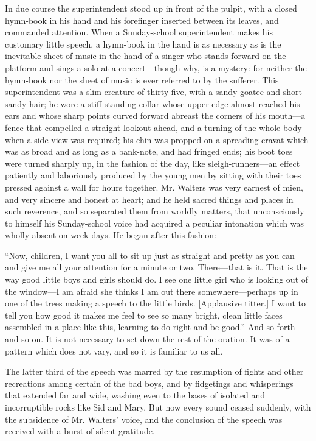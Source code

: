 \documentclass{book}
\begin{document}
In due course the superintendent stood up in front of the pulpit, with a closed hymn-book in his hand and his forefinger inserted between its leaves, and commanded attention. When a Sunday-school superintendent makes his customary little speech, a hymn-book in the hand is as necessary as is the inevitable sheet of music in the hand of a singer who stands forward on the platform and sings a solo at a concert—though why, is a mystery: for neither the hymn-book nor the sheet of music is ever referred to by the sufferer. This superintendent was a slim creature of thirty-five, with a sandy goatee and short sandy hair; he wore a stiff standing-collar whose upper edge almost reached his ears and whose sharp points curved forward abreast the corners of his mouth—a fence that compelled a straight lookout ahead, and a turning of the whole body when a side view was required; his chin was propped on a spreading cravat which was as broad and as long as a bank-note, and had fringed ends; his boot toes were turned sharply up, in the fashion of the day, like sleigh-runners—an effect patiently and laboriously produced by the young men by sitting with their toes pressed against a wall for hours together. Mr. Walters was very earnest of mien, and very sincere and honest at heart; and he held sacred things and places in such reverence, and so separated them from worldly matters, that unconsciously to himself his Sunday-school voice had acquired a peculiar intonation which was wholly absent on week-days. He began after this fashion:

“Now, children, I want you all to sit up just as straight and pretty as you can and give me all your attention for a minute or two. There—that is it. That is the way good little boys and girls should do. I see one little girl who is looking out of the window—I am afraid she thinks I am out there somewhere—perhaps up in one of the trees making a speech to the little birds. [Applausive titter.] I want to tell you how good it makes me feel to see so many bright, clean little faces assembled in a place like this, learning to do right and be good.” And so forth and so on. It is not necessary to set down the rest of the oration. It was of a pattern which does not vary, and so it is familiar to us all.

The latter third of the speech was marred by the resumption of fights and other recreations among certain of the bad boys, and by fidgetings and whisperings that extended far and wide, washing even to the bases of isolated and incorruptible rocks like Sid and Mary. But now every sound ceased suddenly, with the subsidence of Mr. Walters’ voice, and the conclusion of the speech was received with a burst of silent gratitude.
\end{document}
